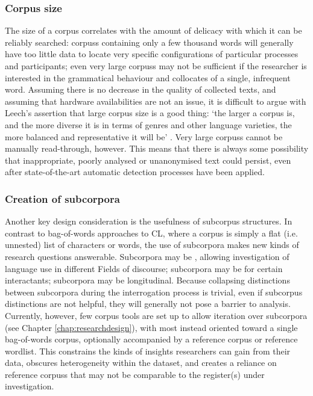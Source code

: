 \subsubsection*{Corpus size}

The size of a \gls{corpus} correlates with the amount of delicacy with which it can be reliably searched: \glspl{corpus} containing only a few thousand words will generally have too little data to locate very specific configurations of particular processes and participants; even very large \glspl{corpus} may not be sufficient if the researcher is interested in the grammatical behaviour and collocates of a single, infrequent word. Assuming there is no decrease in the quality of collected texts, and assuming that hardware availabilities are not an issue, it is difficult to argue with Leech's assertion that large \gls{corpus} size is a good thing: `the larger a \gls{corpus} is, and the more diverse it is in terms of genres and other language varieties, the more balanced and representative it will be' \parencite*[p.~6]{leech_new_2006}. Very large \glspl{corpus} cannot be manually read-through, however. This means that there is always some possibility that inappropriate, poorly analysed or unanonymised text could persist, even after state\hyp{}of\hyp{}the\hyp{}art automatic detection processes have been applied.

\subsubsection*{Creation of subcorpora}

Another key design consideration is the usefulness of subcorpus structures. In contrast to bag\hyp{}of\hyp{}words approaches to \gls{CL}, where a \gls{corpus} is simply a flat (i.e. unnested) list of characters or words, the use of subcorpora makes new kinds of research questions answerable. Subcorpora may be , allowing investigation of language use in different Fields of discourse; subcorpora may be for certain interactants; subcorpora may be longitudinal. Because collapsing distinctions between subcorpora during the interrogation process is trivial, even if subcorpus distinctions are not helpful, they will generally not pose a barrier to analysis. Currently, however, few corpus tools are set up to allow iteration over subcorpora (see Chapter \ref{chap:researchdesign}), with most instead oriented toward a single bag\hyp{}of\hyp{}words \gls{corpus}, optionally accompanied by a reference \gls{corpus} or reference wordlist. This constrains the kinds of insights researchers can gain from their data, obscures heterogeneity within the dataset, and creates a reliance on reference \glspl{corpus} that may not be comparable to the register(s) under investigation.

